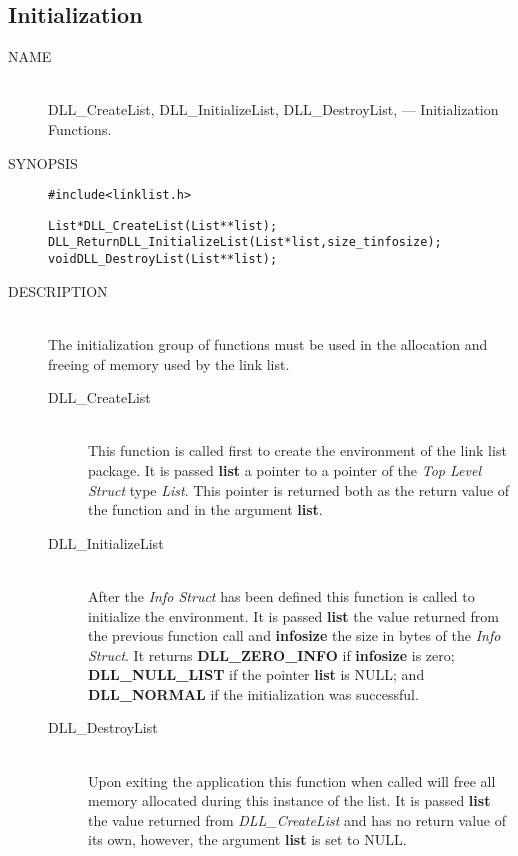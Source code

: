 \documentclass[10pt,letterpaper,titlepage]{article}
\begin{document}
\subsection{Initialization}
\begin{description}
\item[NAME]\quad\\
DLL\_CreateList, DLL\_InitializeList, DLL\_DestroyList, --- Initialization Functions.

\item[SYNOPSIS]
\begin{alltt}

#include <linklist.h>

List *DLL_CreateList(List **list);
DLL_Return DLL_InitializeList(List *list, size_t infosize);
void DLL_DestroyList(List **list);
\end{alltt}

\item[DESCRIPTION]\quad\\
The initialization group of functions must be used in the allocation and freeing of memory used by the link list.

 \begin{description}
 \item[DLL\_CreateList]\quad\\
 This function is called first to create the environment of the link list package.  It is passed \textbf{list} a pointer to a pointer of the \emph{Top Level Struct} type \emph{List}.  This pointer is returned both as the return value of the function and in the argument \textbf{list}.

 \item[DLL\_InitializeList]\quad\\
 After the \emph{Info Struct} has been defined this function is called to initialize the environment.  It is passed \textbf{list} the value returned from the previous function call and \textbf{infosize} the size in bytes of the \emph{Info Struct}.  It returns \textbf{DLL\_ZERO\_INFO} if \textbf{infosize} is zero; \textbf{DLL\_NULL\_LIST} if the pointer \textbf{list} is NULL; and \textbf{DLL\_NORMAL} if the initialization was successful.

 \item[DLL\_DestroyList]\quad\\
 Upon exiting the application this function when called will free all memory allocated during this instance of the list.  It is passed \textbf{list} the value returned from \emph{DLL\_CreateList} and has no return value of its own, however, the argument \textbf{list} is set to NULL.
 \end{description}


\end{description}
\end{document}

